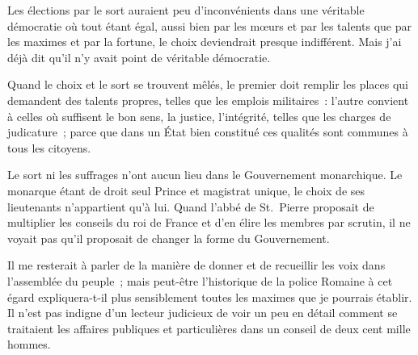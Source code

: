 \documentclass[french,twoside]{book} %
\begin{document}
Les élections par le sort auraient peu d’inconvénients dans une véritable démocratie où tout étant égal, aussi bien par les mœurs et par les talents que par les maximes et par la fortune, le choix deviendrait presque indifférent. Mais j’ai déjà dit qu’il n’y avait point de véritable démocratie.\par
Quand le choix et le sort se trouvent mêlés, le premier doit remplir les places qui demandent des talents propres, telles que les emplois militaires : l’autre convient à celles où suffisent le bon sens, la justice, l’intégrité, telles que les charges de judicature ; parce que dans un État bien constitué ces qualités sont communes à tous les citoyens.\par
Le sort ni les suffrages n’ont aucun lieu dans le Gouvernement monarchique. Le monarque étant de droit seul Prince et magistrat unique, le choix de ses lieutenants n’appartient qu’à lui. Quand l’abbé de St. Pierre proposait de multiplier les conseils du roi de France et d’en élire les membres par scrutin, il ne voyait pas qu’il proposait de changer la forme du Gouvernement.\par
Il me resterait à parler de la manière de donner et de recueillir les voix dans l’assemblée du peuple ; mais peut-être l’historique de la police Romaine à cet égard expliquera-t-il plus sensiblement toutes les maximes que je pourrais établir. Il n’est pas indigne d’un lecteur judicieux de voir un peu en détail comment se traitaient les affaires publiques et particulières dans un conseil de deux cent mille hommes.
\end{document}

